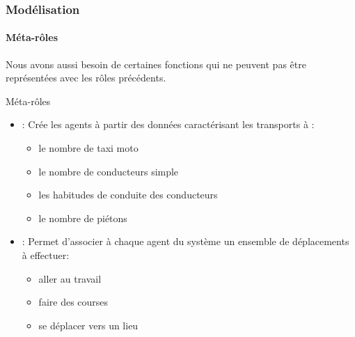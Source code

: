 %
%
%
%

\begin{frame}
    \frametitle{Modélisation}
    \framesubtitle{Méta-rôles}

    Nous avons aussi besoin de certaines fonctions qui ne peuvent pas être représentées avec les rôles précédents.
    \begin{block}{Méta-rôles}
        \begin{itemize}
            \item \rGenerateurPop{}: Crée les agents à partir des données caractérisant les transports à \ctn{}:
            \begin{itemize}
                \item le nombre de taxi moto
                \item le nombre de conducteurs simple
                \item les habitudes de conduite des conducteurs
                \item le nombre de piétons
            \end{itemize}
            \item \rAssociateurActivite{}: Permet d'associer à chaque agent du système un ensemble de déplacements à effectuer:
            \begin{itemize}
                \item aller au travail
                \item faire des courses
                \item se déplacer vers un lieu
            \end{itemize}
        \end{itemize}
    \end{block}
\end{frame}


